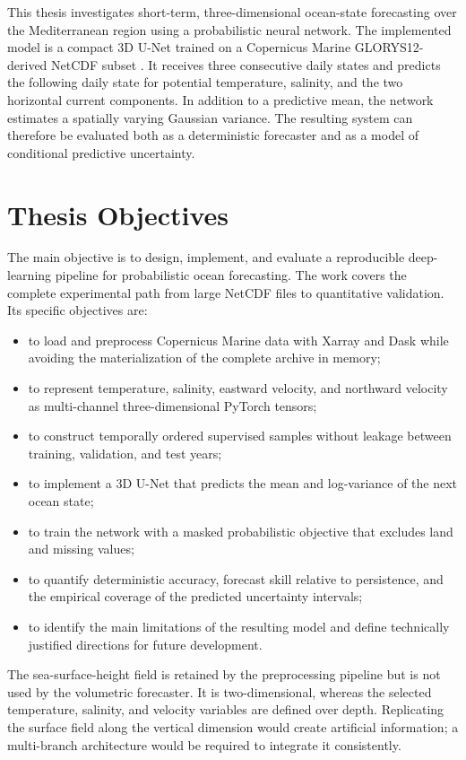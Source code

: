 This thesis investigates short-term, three-dimensional ocean-state forecasting over the Mediterranean region using a probabilistic neural network. The implemented model is a compact 3D U-Net trained on a Copernicus Marine GLORYS12-derived NetCDF subset \citep{copernicusglorys12,lellouche2021glorys12}. It receives three consecutive daily states and predicts the following daily state for potential temperature, salinity, and the two horizontal current components. In addition to a predictive mean, the network estimates a spatially varying Gaussian variance. The resulting system can therefore be evaluated both as a deterministic forecaster and as a model of conditional predictive uncertainty.

\section{Thesis Objectives}

The main objective is to design, implement, and evaluate a reproducible deep-learning pipeline for probabilistic ocean forecasting. The work covers the complete experimental path from large NetCDF files to quantitative validation. Its specific objectives are:

\begin{itemize}
  \item to load and preprocess Copernicus Marine data with Xarray and Dask while avoiding the materialization of the complete archive in memory;
  \item to represent temperature, salinity, eastward velocity, and northward velocity as multi-channel three-dimensional PyTorch tensors;
  \item to construct temporally ordered supervised samples without leakage between training, validation, and test years;
  \item to implement a 3D U-Net that predicts the mean and log-variance of the next ocean state;
  \item to train the network with a masked probabilistic objective that excludes land and missing values;
  \item to quantify deterministic accuracy, forecast skill relative to persistence, and the empirical coverage of the predicted uncertainty intervals;
  \item to identify the main limitations of the resulting model and define technically justified directions for future development.
\end{itemize}

The sea-surface-height field is retained by the preprocessing pipeline but is not used by the volumetric forecaster. It is two-dimensional, whereas the selected temperature, salinity, and velocity variables are defined over depth. Replicating the surface field along the vertical dimension would create artificial information; a multi-branch architecture would be required to integrate it consistently.


